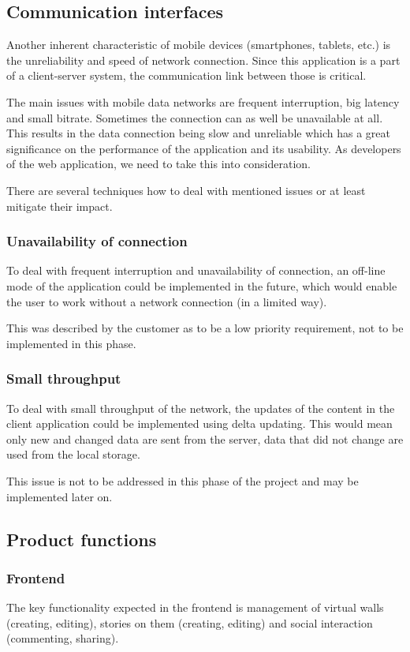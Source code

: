 \documentclass[11pt]{book}
\begin{document}
\subsection{Communication interfaces}
Another inherent characteristic of mobile devices (smartphones, tablets, etc.) is the unreliability and speed of network connection. Since this application is a part of a client-server system, the communication link between those is critical.

The main issues with mobile data networks are frequent interruption, big latency and small bitrate. Sometimes the connection can as well be unavailable at all. This results in the data connection being slow and unreliable which has a great significance on the performance of the application and its usability. As developers of the web application, we need to take this into consideration.

There are several techniques how to deal with mentioned issues or at least mitigate their impact.

\subsubsection{Unavailability of connection}\label{sec:unavailabilityofconnection}
To deal with frequent interruption and unavailability of connection, an off-line mode of the application could be implemented in the future, which would enable the user to work without a network connection (in a limited way).

This was described by the customer as to be a low priority requirement, not to be implemented in this phase.

\subsubsection{Small throughput}
To deal with small throughput of the network, the updates of the content in the client application could be implemented using delta updating. This would mean only new and changed data are sent from the server, data that did not change are used from the local storage.

This issue is not to be addressed in this phase of the project and may be implemented later on.

\subsection{Product functions}

\subsubsection{Frontend}
The key functionality expected in the frontend is management of virtual walls (creating, editing), stories on them (creating, editing) and social interaction (commenting, sharing).
\end{document}
